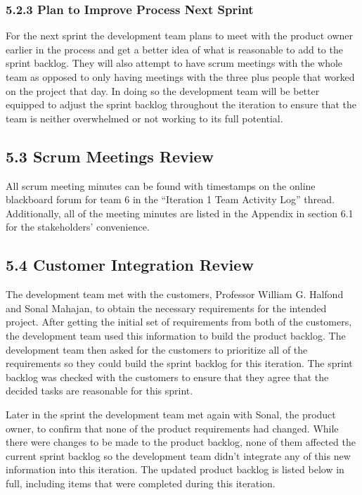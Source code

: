 \documentclass[]{article}
\begin{document}
\subsubsection{5.2.3 Plan to Improve Process Next
Sprint}\label{plan-to-improve-process-next-sprint}

For the next sprint the development team plans to meet with the product
owner earlier in the process and get a better idea of what is reasonable
to add to the sprint backlog. They will also attempt to have scrum
meetings with the whole team as opposed to only having meetings with the
three plus people that worked on the project that day. In doing so the
development team will be better equipped to adjust the sprint backlog
throughout the iteration to ensure that the team is neither overwhelmed
or not working to its full potential.

\subsection{5.3 Scrum Meetings Review}\label{scrum-meetings-review}

All scrum meeting minutes can be found with timestamps on the online
blackboard forum for team 6 in the ``Iteration 1 Team Activity Log''
thread. Additionally, all of the meeting minutes are listed in the
Appendix in section 6.1 for the stakeholders' convenience.

\subsection{5.4 Customer Integration
Review}\label{customer-integration-review}

The development team met with the customers, Professor William G.
Halfond and Sonal Mahajan, to obtain the necessary requirements for the
intended project. After getting the initial set of requirements from
both of the customers, the development team used this information to
build the product backlog. The development team then asked for the
customers to prioritize all of the requirements so they could build the
sprint backlog for this iteration. The sprint backlog was checked with
the customers to ensure that they agree that the decided tasks are
reasonable for this sprint.

Later in the sprint the development team met again with Sonal, the
product owner, to confirm that none of the product requirements had
changed. While there were changes to be made to the product backlog,
none of them affected the current sprint backlog so the development team
didn't integrate any of this new information into this iteration. The
updated product backlog is listed below in full, including items that
were completed during this iteration.
\end{document}
